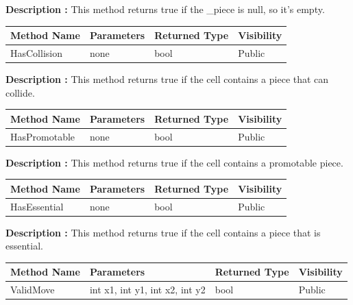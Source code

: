 \documentclass[12pt]{article}
\begin{document}
\textbf{Description :} This method returns true if the \_piece is null, so it's empty.

\begin{table}[H]
    \begin{tabular}{|l|l|l|l|}
    \hline
    \rowcolor[HTML]{EFEFEF} 
    \cellcolor[HTML]{EFEFEF}\textbf{Method Name} & \textbf{Parameters}     & \textbf{Returned Type} & \textbf{Visibility} \\ \hline
    HasCollision                                 & none                    & bool                   & Public              \\ \hline
    \end{tabular}
\end{table}

\textbf{Description :} This method returns true if the cell contains a piece that can collide.

\begin{table}[H]
    \begin{tabular}{|l|l|l|l|}
    \hline
    \rowcolor[HTML]{EFEFEF} 
    \cellcolor[HTML]{EFEFEF}\textbf{Method Name} & \textbf{Parameters}     & \textbf{Returned Type} & \textbf{Visibility} \\ \hline
    HasPromotable                                & none                    & bool                   & Public              \\ \hline
    \end{tabular}
\end{table}

\textbf{Description :} This method returns true if the cell contains a promotable piece.

\begin{table}[H]
    \begin{tabular}{|l|l|l|l|}
    \hline
    \rowcolor[HTML]{EFEFEF} 
    \cellcolor[HTML]{EFEFEF}\textbf{Method Name} & \textbf{Parameters}     & \textbf{Returned Type} & \textbf{Visibility} \\ \hline
    HasEssential                                 & none                    & bool                   & Public              \\ \hline
    \end{tabular}
\end{table}

\textbf{Description :} This method returns true if the cell contains a piece that is essential.

\begin{table}[H]
    \begin{tabular}{|l|l|l|l|}
    \hline
    \rowcolor[HTML]{EFEFEF} 
    \cellcolor[HTML]{EFEFEF}\textbf{Method Name} & \textbf{Parameters}            & \textbf{Returned Type} & \textbf{Visibility} \\ \hline
    ValidMove                                    & int x1, int y1, int x2, int y2 & bool                   & Public              \\ \hline
    \end{tabular}
\end{table}
\end{document}
